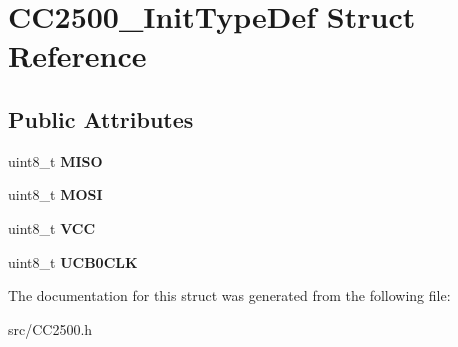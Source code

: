 \hypertarget{struct_c_c2500___init_type_def}{\section{C\-C2500\-\_\-\-Init\-Type\-Def Struct Reference}
\label{struct_c_c2500___init_type_def}
}
\subsection*{Public Attributes}
\begin{DoxyCompactItemize}
\item 
\hypertarget{struct_c_c2500___init_type_def_afb063e88c722e502438f8bec48df5688}{uint8\-\_\-t {\bfseries M\-I\-S\-O}}\label{struct_c_c2500___init_type_def_afb063e88c722e502438f8bec48df5688}

\item 
\hypertarget{struct_c_c2500___init_type_def_a800e35996c8843bdb7febf8ea69cec5d}{uint8\-\_\-t {\bfseries M\-O\-S\-I}}\label{struct_c_c2500___init_type_def_a800e35996c8843bdb7febf8ea69cec5d}

\item 
\hypertarget{struct_c_c2500___init_type_def_a93335464311a115626967ac90af36dcc}{uint8\-\_\-t {\bfseries V\-C\-C}}\label{struct_c_c2500___init_type_def_a93335464311a115626967ac90af36dcc}

\item 
\hypertarget{struct_c_c2500___init_type_def_ac7759927d1deafb9eab9bd47eaf4feaa}{uint8\-\_\-t {\bfseries U\-C\-B0\-C\-L\-K}}\label{struct_c_c2500___init_type_def_ac7759927d1deafb9eab9bd47eaf4feaa}

\end{DoxyCompactItemize}


The documentation for this struct was generated from the following file\-:\begin{DoxyCompactItemize}
\item 
src/C\-C2500.\-h\end{DoxyCompactItemize}
